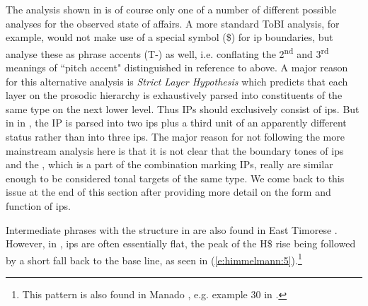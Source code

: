 \documentclass[output=paper
,modfonts
,nonflat]{langsci/langscibook}
\begin{document}
\noindent
The analysis shown in  is of course only one of a number of different possible analyses for the observed state of affairs. A more standard ToBI analysis, for example, would not make use of a special symbol (\$) for ip boundaries, but analyse these as phrase accents (T-) as well, i.e. conflating the 2\textsuperscript{nd} and 3\textsuperscript{rd} meanings of “pitch accent" distinguished in reference to  above. A major reason for this alternative analysis is  \textit{Strict Layer Hypothesis} which predicts that each layer on the prosodic hierarchy is exhaustively parsed into constituents of the same type on the next lower level. Thus IPs should exclusively consist of ips. But in in , the IP is parsed into two ips plus a third unit of an apparently different status rather than into three ips. The major reason for not following the more mainstream analysis here is that it is not clear that the boundary tones of ips and the , which is a part of the  combination marking IPs, really are similar enough to be considered tonal targets of the same type. We come back to this issue at the end of this section after providing more detail on the form and function of ips.

Intermediate phrases with the structure in  are also found in East Timorese . However, in , ips are often essentially flat, the peak of the H\$ rise being followed by a short fall back to the base line, as seen in (\ref{e:himmelmann:5}).\footnote{This pattern is also found in Manado , e.g. example 30 in \citet[130]{Stoel2007}.} 

\end{document}
